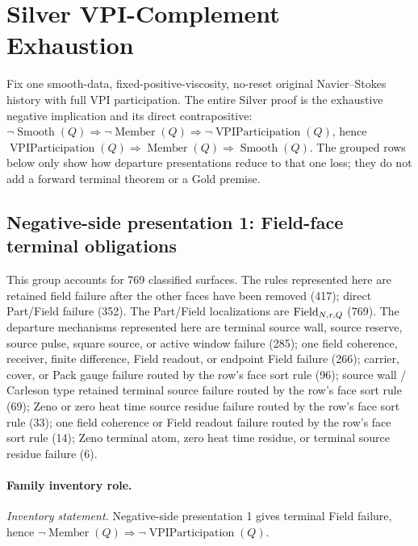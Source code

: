 
\clearpage
\section{Silver VPI-Complement Exhaustion}

Fix one smooth-data, fixed-positive-viscosity, no-reset original Navier--Stokes history with full VPI participation. The entire Silver proof is the exhaustive negative implication and its direct contrapositive: \(\neg\operatorname{Smooth}(Q)\Rightarrow\neg\operatorname{Member}(Q)\Rightarrow\neg\operatorname{VPIParticipation}(Q)\), hence \(\operatorname{VPIParticipation}(Q)\Rightarrow\operatorname{Member}(Q)\Rightarrow\operatorname{Smooth}(Q)\). The grouped rows below only show how departure presentations reduce to that one loss; they do not add a forward terminal theorem or a Gold premise.

\subsection{Negative-side presentation 1: Field-face terminal obligations}
This group accounts for 769 classified surfaces. The rules represented here are retained field failure after the other faces have been removed (417); direct Part/Field failure (352). The Part/Field localizations are \(\mathrm{Field}_{N,r,Q}\) (769). The departure mechanisms represented here are terminal source wall, source reserve, source pulse, square source, or active window failure (285); one field coherence, receiver, finite difference, Field readout, or endpoint Field failure (266); carrier, cover, or Pack gauge failure routed by the row's face sort rule (96); source wall / Carleson type retained terminal source failure routed by the row's face sort rule (69); Zeno or zero heat time source residue failure routed by the row's face sort rule (33); one field coherence or Field readout failure routed by the row's face sort rule (14); Zeno terminal atom, zero heat time residue, or terminal source residue failure (6).

\paragraph{Family inventory role.}
\emph{Inventory statement.} Negative-side presentation 1 gives terminal Field failure, hence \(\neg\operatorname{Member}(Q)\Rightarrow\neg\operatorname{VPIParticipation}(Q)\).

